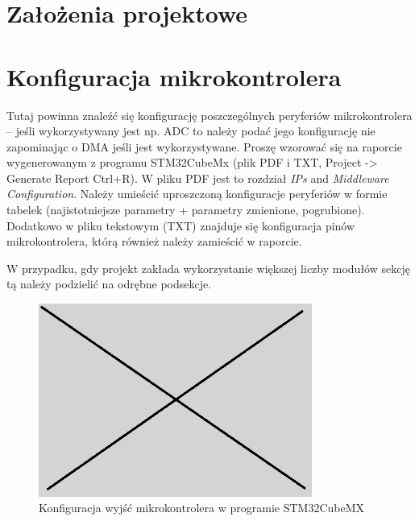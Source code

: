 \documentclass[10pt, a4paper]{article}
\begin{document}
\section{Założenia projektowe}

\section{Konfiguracja mikrokontrolera}

Tutaj powinna znaleźć się konfigurację poszczególnych peryferiów 
mikrokontrolera -- jeśli wykorzystywany jest np. ADC to należy 
podać jego konfigurację nie zapominając o DMA jeśli jest 
wykorzystywane. Proszę wzorować się na raporcie wygenerowanym 
z programu STM32CubeMx 
(plik PDF i TXT, Project -> Generate Report Ctrl+R). 
W pliku PDF jest to rozdział \textit{IPs} and \textit{Middleware Configuration}. 
Należy umieścić uproszczoną konfiguracje peryferiów w formie 
tabelek (najistotniejsze parametry + parametry zmienione, pogrubione).
Dodatkowo w pliku tekstowym (TXT) znajduje się konfiguracja pinów 
mikrokontrolera, którą również należy zamieścić w raporcie.

W przypadku, gdy projekt zakłada wykorzystanie większej liczby modułów
sekcję tą należy podzielić na odrębne podsekcje.

\begin{figure}[H]
	\centering
	\includegraphics[width=0.8\textwidth]{obraz.png}
	\caption{Konfiguracja wyjść mikrokontrolera w programie STM32CubeMX}
	\label{fig:KonfiguracjaMikrokontrolera}
\end{figure}
\end{document}
